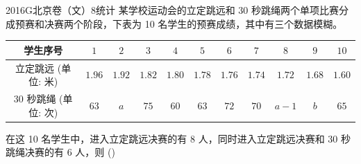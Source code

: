 
\begin{problem}{2016}{G}{北京卷（文）}{8}{统计}
某学校运动会的立定跳远和 30 秒跳绳两个单项比赛分成预赛和决赛两个阶段，下表为 10 名学生的预赛成绩，其中有三个数据模糊。

\begin{center}
\begin{tabular}{|c|c|c|c|c|c|c|c|c|c|c|}
\hline
学生序号 & $1$ & $2$ & $3$ & $4$ & $5$ & $6$ & $7$ & $8$ & $9$ & $10$ \\
\hline
立定跳远 (单位: 米) & $1.96$ & $1.92$ & $1.82$ & $1.80$ & $1.78$ & $1.76$ & $1.74$ & $1.72$ & $1.68$ & $1.60$ \\
\hline
30 秒跳绳 (单位: 次) & $63$ & $a$ & $75$ & $60$ & $63$ & $72$ & $70$ & $a-1$ & $b$ & $65$ \\
\hline
\end{tabular}
\end{center}

在这 10 名学生中，进入立定跳远决赛的有 8 人，同时进入立定跳远决赛和 30 秒跳绳决赛的有 6 人，则 (\hspace{1cm})
\begin{choices}
\end{choices}
\end{problem}

\begin{answer}

\end{answer}

\begin{solutions}

\end{solutions}